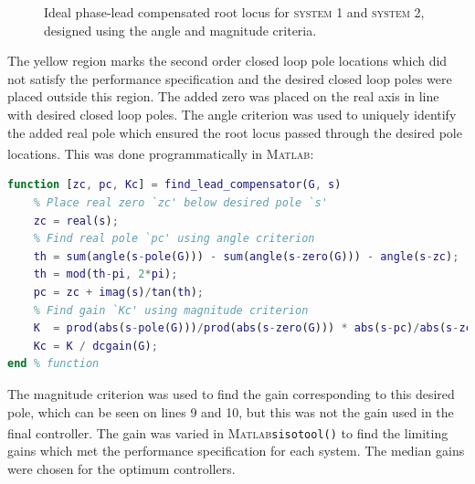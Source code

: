\documentclass[a4paper,11pt,twocolumn]{article}
\newcommand{\Matlab}{\textsc{Matlab}\textsuperscript{\textregistered}\xspace}
\begin{document}
\begin{figure}[h]
	\caption{Ideal phase-lead compensated root locus for \textcolor{red!}{\textsc{system} 1} and \textcolor{blue!}{\textsc{system} 2}, designed using the angle and magnitude criteria.}
	\label{fig:derive_lead}
\end{figure}

The yellow region marks the second order closed loop pole locations which did not satisfy the performance specification and the desired closed loop poles were placed outside this region. The added zero was placed on the real axis in line with desired closed loop poles. The angle criterion was used to uniquely identify the added real pole which ensured the root locus passed through the desired pole locations. This was done programmatically in \Matlab:
\begin{lstlisting}[language=Matlab,style=mystyle,morekeywords={mod,pole,zero,dcgain}]
function [zc, pc, Kc] = find_lead_compensator(G, s)
	% Place real zero `zc' below desired pole `s'
	zc = real(s);
	% Find real pole `pc' using angle criterion
	th = sum(angle(s-pole(G))) - sum(angle(s-zero(G))) - angle(s-zc);
	th = mod(th-pi, 2*pi);
	pc = zc + imag(s)/tan(th);
	% Find gain `Kc' using magnitude criterion
	K  = prod(abs(s-pole(G)))/prod(abs(s-zero(G))) * abs(s-pc)/abs(s-zc);
	Kc = K / dcgain(G);
end % function
\end{lstlisting}

The magnitude criterion was used to find the gain corresponding to this desired pole, which can be seen on lines 9 and 10, but this was not the gain used in the final controller. The gain was varied in \Matlab \texttt{sisotool()} to find the limiting gains which met the performance specification for each system. The median gains were chosen for the optimum controllers.
\end{document}
